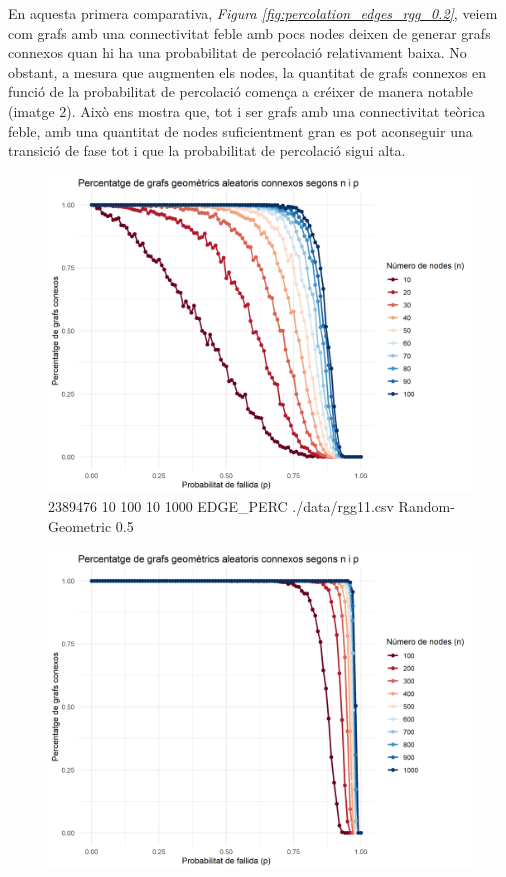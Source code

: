 \documentclass[a4paper]{article}
\begin{document}
	En aquesta primera comparativa, \textit{Figura \ref{fig:percolation_edges_rgg_0.2}}, veiem com grafs amb una connectivitat feble amb pocs nodes deixen de generar grafs connexos quan hi ha una probabilitat de percolació relativament baixa. No obstant, a mesura que augmenten els nodes, la quantitat de grafs connexos
	en funció de la probabilitat de percolació comença a créixer de manera notable (imatge 2). Això ens mostra que, tot i ser grafs amb una connectivitat teòrica feble, amb una quantitat de nodes suficientment gran es pot aconseguir una transició de fase tot i que la probabilitat
	de percolació sigui alta. 
	
	\begin{figure}[H]
		\centering
		\begin{minipage}{0.45\textwidth}
			\centering
			\includegraphics[width=\textwidth]{images/randomGeometric_10-100_0.5}
			\footnotesize{2389476 10 100 10 1000 EDGE\_PERC ./data/rgg11.csv Random-Geometric 0.5}
		\end{minipage}
		\hfill
		\begin{minipage}{0.45\textwidth}
			\centering
			\includegraphics[width=\textwidth]{images/randomGeometric_100-1000_0.5}

\end{minipage}
\end{figure}
\end{document}
